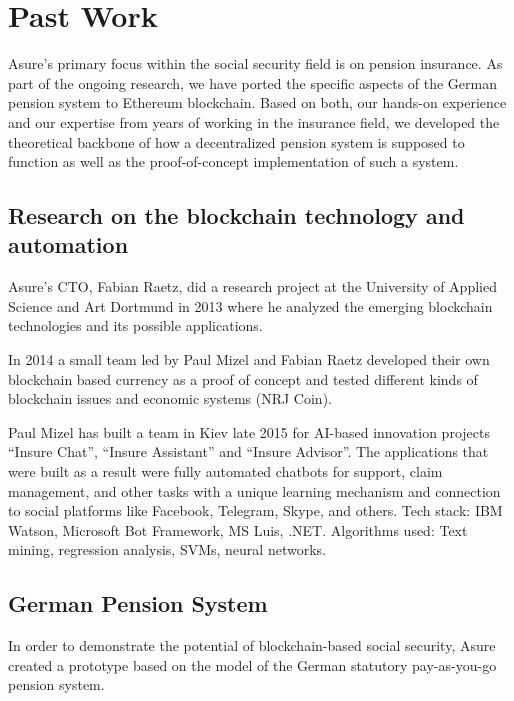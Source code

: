 \section{Past Work}

Asure’s primary focus within the social security field is on pension insurance. As part of the ongoing research, we have ported the specific aspects of the German pension system to Ethereum blockchain. Based on both, our hands-on experience and our expertise from years of working in the insurance field, we developed the theoretical backbone of how a decentralized pension system is supposed to function as well as the proof-of-concept implementation of such a system. 

\subsection{Research on the blockchain technology and automation}

Asure’s CTO, Fabian Raetz, did a research project at the University of Applied Science and Art Dortmund in 2013 where he analyzed the emerging blockchain technologies and its possible applications. \cite{fraetz}
\newline

In 2014 a small team led by Paul Mizel and Fabian Raetz developed their own blockchain based currency as a proof of concept and tested different kinds of blockchain issues and economic systems (NRJ Coin). \cite{nrjcoin}
\newline

Paul Mizel has built a team in Kiev late 2015 for AI-based innovation projects  “Insure Chat”, “Insure Assistant” and “Insure Advisor”. The applications that were built as a result were fully automated chatbots for support, claim management, and other tasks with a unique learning mechanism and connection to social platforms like Facebook, Telegram, Skype, and others.\newline
Tech stack: IBM Watson, Microsoft Bot Framework, MS Luis, .NET.
\newline
Algorithms used: Text mining, regression analysis, SVMs, neural networks.

\subsection{German Pension System}
In order to demonstrate the potential of blockchain-based social security, Asure created a prototype based on the model of the German statutory pay-as-you-go pension system.
\newline\newline


